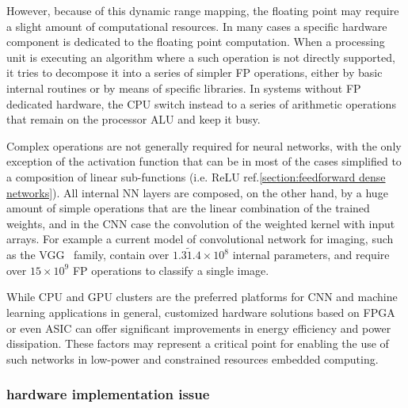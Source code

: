 
However, because of this dynamic range mapping, the floating point may require a slight amount of computational resources.
In many cases a specific hardware component is dedicated to the floating point computation. When a processing unit is executing an algorithm where a such operation is not directly supported, it tries to decompose it into a series of simpler \acs{FP} operations, either by basic internal routines or by means of specific libraries.
In systems without \acs{FP} dedicated hardware, the CPU switch instead to a series of arithmetic operations that remain on the processor \ac{ALU} and keep it busy.

Complex operations are not generally required for neural networks, with the only exception of the activation function that can be in most of the cases simplified to a composition of linear sub-functions (i.e. ReLU ref.\cref{section:feedforward dense networks}). All internal NN layers are composed, on the other hand, by a huge amount of simple operations that are the linear combination of the trained weights, and in the \acs{CNN} case the convolution of the weighted kernel with input arrays.
For example a current model of convolutional network for imaging, such as the VGG~\cite{Simonyan15} family, contain over
$1.3\tilde1.4\times10^8$ internal parameters, and require over $15\times10^9$ \acs{FP} operations to classify a single image.

While CPU and GPU clusters are the preferred platforms for \acs{CNN} and machine learning applications in general, customized hardware solutions based on \acs{FPGA} or even \acs{ASIC} can offer significant improvements in energy efficiency and power dissipation. 
These factors may represent a critical point for enabling the use of such networks in low-power and constrained resources embedded computing.

\subsubsection*{hardware implementation issue}

